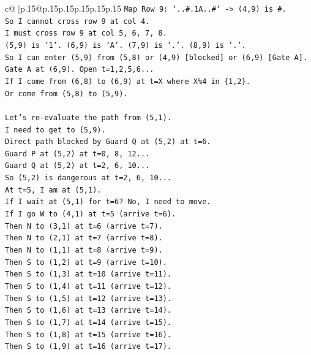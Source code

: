 \documentclass{article}
\begin{document}
{\begin{supertabular}{c@{$\;$}|p{.15\linewidth}@{}p{.15\linewidth}p{.15\linewidth}p{.15\linewidth}p{.15\linewidth}p{.15\linewidth}}
{{{\texttt{Map Row 9: `..\#.1A..\#` {-}> (4,9) is \#.} \\
\texttt{So I cannot cross row 9 at col 4.} \\
\texttt{I must cross row 9 at col 5, 6, 7, 8.} \\
\texttt{(5,9) is '1'. (6,9) is 'A'. (7,9) is '.'. (8,9) is '.'.} \\
\texttt{So I can enter (5,9) from (5,8) or (4,9) {[}blocked{]} or (6,9) {[}Gate A{]}.} \\
\texttt{Gate A at (6,9). Open t=1,2,5,6...} \\
\texttt{If I come from (6,8) to (6,9) at t=X where X\%4 in \{1,2\}.} \\
\texttt{Or come from (5,8) to (5,9).} \\
\\ 
\texttt{Let's re{-}evaluate the path from (5,1).} \\
\texttt{I need to get to (5,9).} \\
\texttt{Direct path blocked by Guard Q at (5,2) at t=6.} \\
\texttt{Guard P at (5,2) at t=0, 8, 12...} \\
\texttt{Guard Q at (5,2) at t=2, 6, 10...} \\
\texttt{So (5,2) is dangerous at t=2, 6, 10...} \\
\texttt{At t=5, I am at (5,1).} \\
\texttt{If I wait at (5,1) for t=6? No, I need to move.} \\
\texttt{If I go W to (4,1) at t=5 (arrive t=6).} \\
\texttt{Then N to (3,1) at t=6 (arrive t=7).} \\
\texttt{Then N to (2,1) at t=7 (arrive t=8).} \\
\texttt{Then N to (1,1) at t=8 (arrive t=9).} \\
\texttt{Then S to (1,2) at t=9 (arrive t=10).} \\
\texttt{Then S to (1,3) at t=10 (arrive t=11).} \\
\texttt{Then S to (1,4) at t=11 (arrive t=12).} \\
\texttt{Then S to (1,5) at t=12 (arrive t=13).} \\
\texttt{Then S to (1,6) at t=13 (arrive t=14).} \\
\texttt{Then S to (1,7) at t=14 (arrive t=15).} \\
\texttt{Then S to (1,8) at t=15 (arrive t=16).} \\
\texttt{Then S to (1,9) at t=16 (arrive t=17).} \\
}}}
\end{supertabular}}
\end{document}
